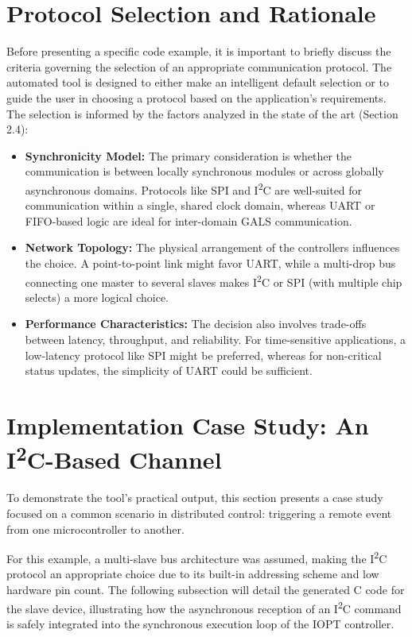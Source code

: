 \section{Protocol Selection and Rationale}
\label{sec:protocol_rationale}

Before presenting a specific code example, it is important to briefly discuss the criteria governing the selection of an appropriate communication protocol. The automated tool is designed to either make an intelligent default selection or to guide the user in choosing a protocol based on the application's requirements. The selection is informed by the factors analyzed in the state of the art (Section 2.4):

\begin{itemize}
    \item \textbf{Synchronicity Model:} The primary consideration is whether the communication is between locally synchronous modules or across globally asynchronous domains. Protocols like SPI and I\textsuperscript{2}C are well-suited for communication within a single, shared clock domain, whereas UART or FIFO-based logic are ideal for inter-domain GALS communication.
    \item \textbf{Network Topology:} The physical arrangement of the controllers influences the choice. A point-to-point link might favor UART, while a multi-drop bus connecting one master to several slaves makes I\textsuperscript{2}C or SPI (with multiple chip selects) a more logical choice.
    \item \textbf{Performance Characteristics:} The decision also involves trade-offs between latency, throughput, and reliability. For time-sensitive applications, a low-latency protocol like SPI might be preferred, whereas for non-critical status updates, the simplicity of UART could be sufficient.
\end{itemize}

\section{Implementation Case Study: An I\textsuperscript{2}C-Based Channel}
\label{sec:case_study_i2c}

To demonstrate the tool's practical output, this section presents a case study focused on a common scenario in distributed control: triggering a remote event from one microcontroller to another.

For this example, a multi-slave bus architecture was assumed, making the I\textsuperscript{2}C protocol an appropriate choice due to its built-in addressing scheme and low hardware pin count. The following subsection will detail the generated C code for the slave device, illustrating how the asynchronous reception of an I\textsuperscript{2}C command is safely integrated into the synchronous execution loop of the IOPT controller.


